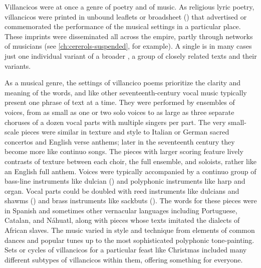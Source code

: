 Villancicos were at once a genre of poetry and of music.
As religious lyric poetry, villancicos were printed in unbound leaflets or
broadsheet () that advertised or commemorated the
performance of the musical settings in a particular place.%
    \Autocites
    {LopezLorenzo:VC-Sevillano}
    {BNE:VCs17C}
These imprints were disseminated all across the empire, partly through networks
of musicians (see \cref{ch:cererols-suspended}, for example).
A single  is in many cases just one individual variant of
a broader , a group of closely related texts and their
variants.

As a musical genre, the settings of villancico poems prioritize the clarity and
meaning of the words, and like other seventeenth-century vocal music typically
present one phrase of text at a time.
They were performed by ensembles of voices, from as small as one or two solo
voices to as large as three separate choruses of a dozen vocal parts with
multiple singers per part.
The very small-scale pieces were similar in texture and style to Italian or
German sacred concertos and English verse anthems; later in the seventeenth
century they become more like continuo songs.%
    \Autocite{Kendrick:SacredSongs}
The pieces with larger scoring feature lively contrasts of texture between each
choir, the full ensemble, and soloists, rather like an English full anthem.
Voices were typically accompanied by a continuo group of bass-line instruments
like dulcian () and polyphonic instruments like harp and organ.
Vocal parts could be doubled with reed instruments like dulcians and shawms
() and brass instruments like sackbuts ().
The words for these pieces were in Spanish and sometimes other vernacular
languages including Portuguese, Catalan, and Náhuatl, along with pieces whose
texts imitated the dialects of African slaves.
The music varied in style and technique from elements of common dances
and popular tunes up to the most sophisticated polyphonic tone-painting.
Sets or cycles of villancicos for a particular feast like Christmas included
many different subtypes of villancicos within them, offering something for
everyone.

